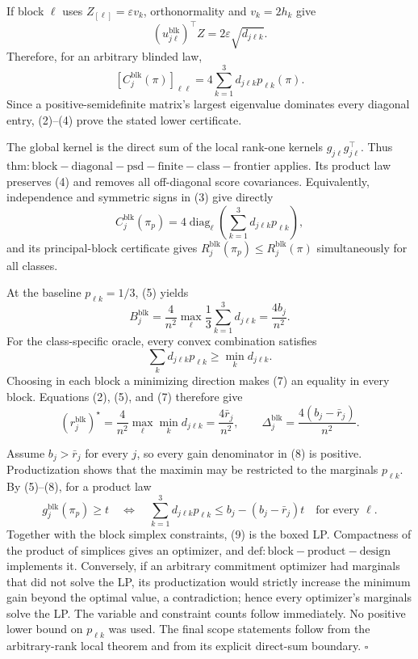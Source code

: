 If block \(\ell\) uses \(Z_{[\ell]}=\varepsilon v_k\), orthonormality and \(v_k=2h_k\) give
\[
(u_{j\ell}^{\mathrm{blk}})^\top Z
=2\varepsilon\sqrt{d_{j\ell k}}. \tag{3}
\]
Therefore, for an arbitrary blinded law,
\[
[C_j^{\mathrm{blk}}(\pi)]_{\ell\ell}
=4\sum_{k=1}^3d_{j\ell k}p_{\ell k}(\pi). \tag{4}
\]
Since a positive-semidefinite matrix's largest eigenvalue dominates every diagonal entry, (2)--(4) prove the stated lower certificate.

The global kernel is the direct sum of the local rank-one kernels \(g_{j\ell}g_{j\ell}^\top\).  Thus \(\mathrm{thm:block-diagonal-psd-finite-class-frontier}\) applies.  Its product law preserves (4) and removes all off-diagonal score covariances.  Equivalently, independence and symmetric signs in (3) give directly
\[
C_j^{\mathrm{blk}}(\pi_p)
=4\operatorname{diag}_{\ell}
\left(\sum_{k=1}^3d_{j\ell k}p_{\ell k}\right), \tag{5}
\]
and its principal-block certificate gives \(R_j^{\mathrm{blk}}(\pi_p)\le R_j^{\mathrm{blk}}(\pi)\) simultaneously for all classes.

At the baseline \(p_{\ell k}=1/3\), (5) yields
\[
B_j^{\mathrm{blk}}
=\frac4{n^2}\max_\ell\frac13\sum_{k=1}^3d_{j\ell k}
=\frac{4b_j}{n^2}. \tag{6}
\]
For the class-specific oracle, every convex combination satisfies
\[
\sum_kd_{j\ell k}p_{\ell k}\ge\min_kd_{j\ell k}. \tag{7}
\]
Choosing in each block a minimizing direction makes (7) an equality in every block.  Equations (2), (5), and (7) therefore give
\[
(r_j^{\mathrm{blk}})^\star
=\frac4{n^2}\max_\ell\min_kd_{j\ell k}
=\frac{4\bar r_j}{n^2},
\qquad
\Delta_j^{\mathrm{blk}}=\frac{4(b_j-\bar r_j)}{n^2}. \tag{8}
\]

Assume \(b_j>\bar r_j\) for every \(j\), so every gain denominator in (8) is positive.  Productization shows that the maximin may be restricted to the marginals \(p_{\ell k}\).  By (5)--(8), for a product law
\[
g_j^{\mathrm{blk}}(\pi_p)\ge t
\quad\Longleftrightarrow\quad
\sum_{k=1}^3d_{j\ell k}p_{\ell k}
\le b_j-(b_j-\bar r_j)t
\quad\text{for every }\ell. \tag{9}
\]
Together with the block simplex constraints, (9) is the boxed LP.  Compactness of the product of simplices gives an optimizer, and \(\mathrm{def:block-product-design}\) implements it.  Conversely, if an arbitrary commitment optimizer had marginals that did not solve the LP, its productization would strictly increase the minimum gain beyond the optimal value, a contradiction; hence every optimizer's marginals solve the LP.  The variable and constraint counts follow immediately.  No positive lower bound on \(p_{\ell k}\) was used.  The final scope statements follow from the arbitrary-rank local theorem and from its explicit direct-sum boundary. \(\square\)

